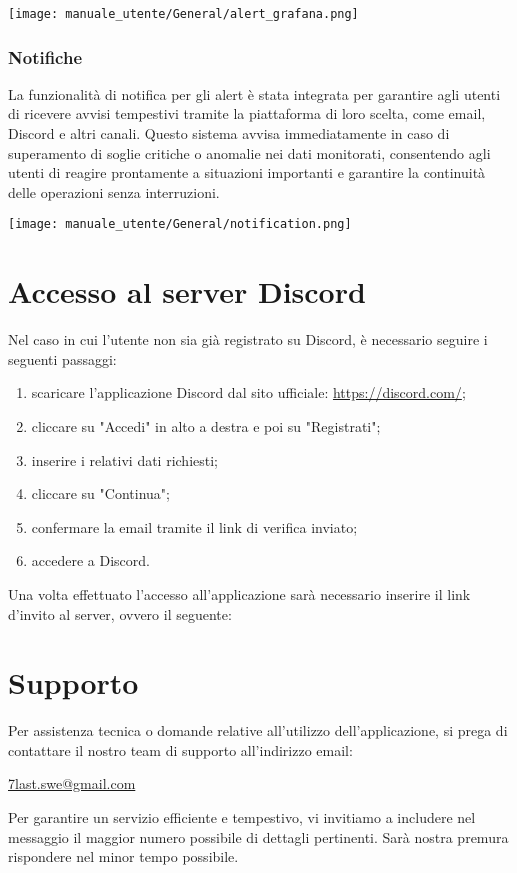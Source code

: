 \begin{center}
    \texttt{[image: manuale\_utente/General/alert\_grafana.png]}
\end{center} 

\subsubsection{Notifiche}
La funzionalità di notifica per gli alert è stata integrata per garantire agli utenti di ricevere avvisi tempestivi tramite la piattaforma di loro scelta, come email, Discord e altri canali. Questo sistema avvisa immediatamente in caso di superamento di soglie critiche o anomalie nei dati monitorati, consentendo agli utenti di reagire prontamente a situazioni importanti e garantire la continuità delle operazioni senza interruzioni.
\begin{center}
    \texttt{[image: manuale\_utente/General/notification.png]}
\end{center} 

\section{Accesso al server Discord}
Nel caso in cui l'utente non sia già registrato su Discord, è necessario seguire i seguenti passaggi:
\begin{enumerate}
    \item scaricare l'applicazione Discord dal sito ufficiale: \url{https://discord.com/};
    \item cliccare su "Accedi" in alto a destra e poi su "Registrati";
    \item inserire i relativi dati richiesti;
    \item cliccare su "Continua";
    \item confermare la email tramite il link di verifica inviato;
    \item accedere a Discord.
\end{enumerate}

\begin{flushleft}
Una volta effettuato l'accesso all'applicazione sarà necessario inserire il link d'invito al server, ovvero il seguente:
\begin{center}
\end{center}
\end{flushleft}
    

\newpage
\section{Supporto}
Per assistenza tecnica o domande relative all’utilizzo dell’applicazione, si prega di contattare il nostro team di supporto all'indirizzo email: 
\begin{center}
    \href{mailto:7last.swe@gmail.com}{7last.swe@gmail.com}
\end{center} 
Per garantire un servizio efficiente e tempestivo, vi invitiamo a includere nel messaggio il maggior numero possibile di dettagli pertinenti. Sarà nostra premura rispondere nel minor tempo possibile.